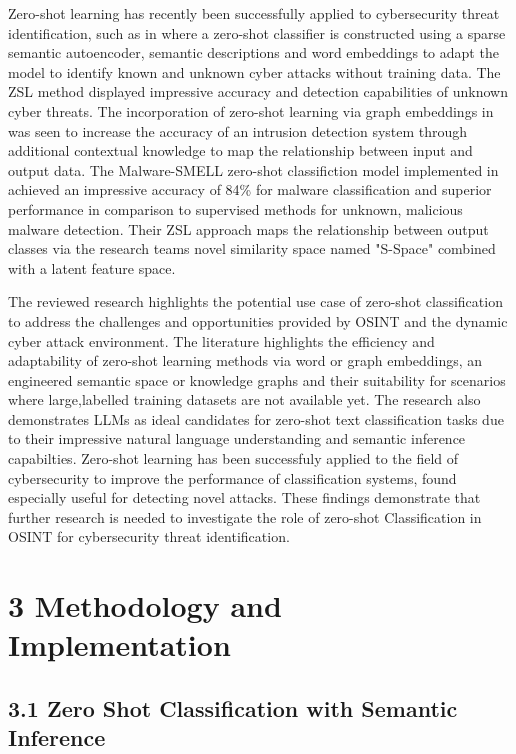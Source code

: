 \documentclass[letterpaper,twocolumn,fleqn]{article}
\begin{document}
Zero-shot learning has recently been successfully applied to cybersecurity threat identification, such as in \cite{zhangUnknownAttackDetection2020} where a zero-shot classifier is constructed using a sparse semantic autoencoder, semantic descriptions and word embeddings to adapt the model to identify known and unknown cyber attacks without training data. The ZSL method displayed impressive accuracy and detection capabilities of unknown cyber threats\cite{zhangUnknownAttackDetection2020}.
The incorporation of zero-shot learning via graph embeddings in \cite{zerhoudiImprovingIntrusionDetection2020} was seen to increase the accuracy of an intrusion detection system through additional contextual knowledge to map the relationship between input and output data. 
The Malware-SMELL zero-shot classifiction model implemented in \cite{barrosMalwareSMELLZeroshotLearning2022} achieved an impressive accuracy of 84\% for malware classification and superior performance in comparison to supervised methods for unknown, malicious malware detection. Their ZSL approach maps the relationship between output classes via the research teams novel similarity space named "S-Space"\cite{barrosMalwareSMELLZeroshotLearning2022} combined with a latent feature space. 

The reviewed research highlights the potential use case of zero-shot classification to address the challenges and opportunities provided by OSINT and the dynamic cyber attack environment. 
The literature highlights the efficiency and adaptability of zero-shot learning methods via word or graph embeddings, an engineered semantic space or knowledge graphs and their suitability for scenarios where large,labelled training datasets are not available yet.
The research also demonstrates LLMs as ideal candidates for zero-shot text classification tasks due to their impressive natural language understanding and semantic inference capabilties.
Zero-shot learning has been successfuly applied to the field of cybersecurity to improve the performance of classification systems, found especially useful for detecting novel attacks. 
These findings demonstrate that further research is needed to investigate the role of zero-shot Classification in OSINT for cybersecurity threat identification. 

\section{3 Methodology and Implementation}
\label{method}

\subsection{3.1 Zero Shot Classification with Semantic Inference}
\end{document}
